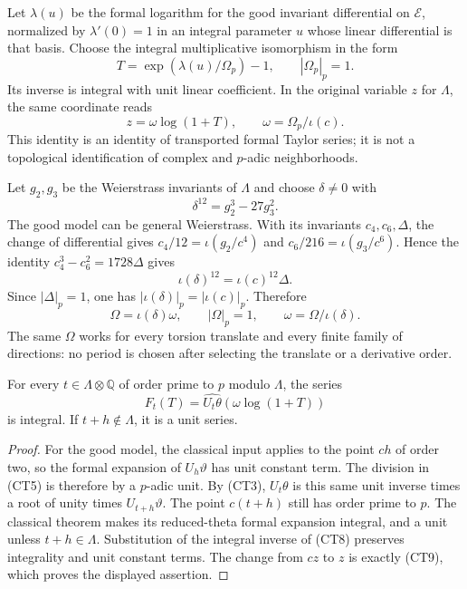 Let $\lambda(u)$ be the formal logarithm for the good invariant
differential on $\mathscr E$, normalized by $\lambda'(0)=1$ in
an integral parameter $u$ whose linear differential is that basis.
Choose the integral multiplicative isomorphism in the form
\[
                T=\exp(\lambda(u)/\Omega_p)-1,
                  \qquad |\Omega_p|_p=1.
 \tag{CT8}
\]
Its inverse is integral with unit linear coefficient.  In the
original variable $z$ for $\Lambda$, the same coordinate reads
\[
              z=\omega\log(1+T),\qquad
                        \omega=\Omega_p/\iota(c).
 \tag{CT9}
\]
This identity is an identity of transported formal Taylor series;
it is not a topological identification of complex and $p$-adic
neighborhoods.

Let $g_2,g_3$ be the Weierstrass invariants of $\Lambda$ and choose
$\delta\ne0$ with
\[
                       \delta^{12}=g_2^3-27g_3^2.
 \tag{CT10}
\]
The good model can be general Weierstrass.  With its invariants
$c_4,c_6,\Delta$, the change of differential gives
$c_4/12=\iota(g_2/c^4)$ and
$c_6/216=\iota(g_3/c^6)$.  Hence the identity
$c_4^3-c_6^2=1728\Delta$ gives
\[
               \iota(\delta)^{12}=\iota(c)^{12}\Delta.
 \tag{CT11}
\]
Since $|\Delta|_p=1$, one has
$|\iota(\delta)|_p=|\iota(c)|_p$.  Therefore
\[
             \Omega=\iota(\delta)\omega,
                    \qquad |\Omega|_p=1,
                    \qquad\omega=\Omega/\iota(\delta).
 \tag{CT12}
\]
The same $\Omega$ works for every torsion translate and every
finite family of directions: no period is chosen after selecting
the translate or a derivative order.

\begin{proposition}\label{ct-translates-integral}
For every $t\in\Lambda\otimes\mathbb Q$ of order prime to $p$
modulo $\Lambda$, the series
\[
                 F_t(T)=\widehat{U_t\theta}
                                  (\omega\log(1+T))
 \tag{CT13}
\]
is integral.  If $t+h\notin\Lambda$, it is a unit series.
\end{proposition}
\begin{proof}
For the good model, the classical input applies to the point $ch$
of order two, so the formal expansion of $U_h\vartheta$ has unit
constant term.  The division in (CT5) is therefore by a $p$-adic
unit.  By (CT3), $U_t\theta$ is this same unit inverse times a
root of unity times $U_{t+h}\vartheta$.
The point $c(t+h)$ still has order prime to $p$.
The classical theorem makes its reduced-theta formal expansion
integral, and a unit unless $t+h\in\Lambda$.  Substitution of
the integral inverse of (CT8) preserves integrality and unit
constant terms.  The change from $cz$ to $z$ is exactly (CT9),
which proves the displayed assertion.
\end{proof}

